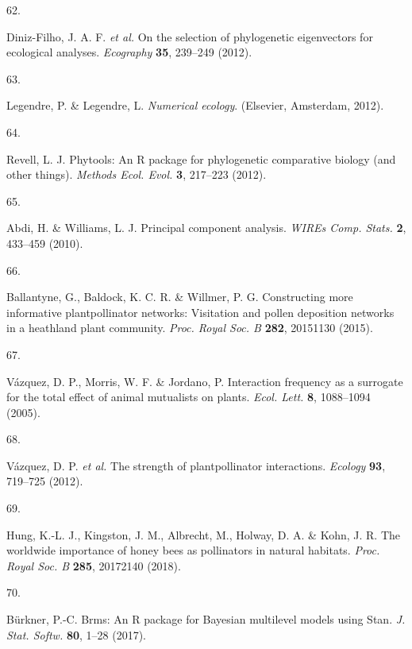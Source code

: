 \documentclass[
  12pt,
  a4paper,
]{article}
\newlength{\cslhangindent}
\newlength{\csllabelwidth}
\newlength{\cslentryspacingunit} %
\newenvironment{CSLReferences}[2] %
 {%
  \setlength{\parindent}{0pt}
  \ifodd #1
  \let\oldpar\par
  \def\par{\hangindent=\cslhangindent\oldpar}
  \fi
  \setlength{\parskip}{#2\cslentryspacingunit}
 }%
 {}
\newcommand{\CSLLeftMargin}[1]{\parbox[t]{\csllabelwidth}{#1}}
\newcommand{\CSLRightInline}[1]{\parbox[t]{\linewidth - \csllabelwidth}{#1}\break}
\begin{document}
\begin{CSLReferences}{0}{0}
\leavevmode{}%
\CSLLeftMargin{62. }
\CSLRightInline{Diniz-Filho, J. A. F. \emph{et al.} On the selection of phylogenetic eigenvectors for ecological analyses. \emph{Ecography} \textbf{35}, 239--249 (2012).}

\leavevmode{}%
\CSLLeftMargin{63. }
\CSLRightInline{Legendre, P. \& Legendre, L. \emph{Numerical ecology}. ({Elsevier, Amsterdam}, 2012).}

\leavevmode{}%
\CSLLeftMargin{64. }
\CSLRightInline{Revell, L. J. Phytools: An {R} package for phylogenetic comparative biology (and other things). \emph{Methods Ecol. Evol.} \textbf{3}, 217--223 (2012).}

\leavevmode{}%
\CSLLeftMargin{65. }
\CSLRightInline{Abdi, H. \& Williams, L. J. Principal component analysis. \emph{WIREs Comp. Stats.} \textbf{2}, 433--459 (2010).}

\leavevmode{}%
\CSLLeftMargin{66. }
\CSLRightInline{Ballantyne, G., Baldock, K. C. R. \& Willmer, P. G. Constructing more informative plant\textendash pollinator networks: Visitation and pollen deposition networks in a heathland plant community. \emph{Proc. Royal Soc. B} \textbf{282}, 20151130 (2015).}

\leavevmode{}%
\CSLLeftMargin{67. }
\CSLRightInline{Vázquez, D. P., Morris, W. F. \& Jordano, P. Interaction frequency as a surrogate for the total effect of animal mutualists on plants. \emph{Ecol. Lett.} \textbf{8}, 1088--1094 (2005).}

\leavevmode{}%
\CSLLeftMargin{68. }
\CSLRightInline{Vázquez, D. P. \emph{et al.} The strength of plant\textendash pollinator interactions. \emph{Ecology} \textbf{93}, 719--725 (2012).}

\leavevmode{}%
\CSLLeftMargin{69. }
\CSLRightInline{Hung, K.-L. J., Kingston, J. M., Albrecht, M., Holway, D. A. \& Kohn, J. R. The worldwide importance of honey bees as pollinators in natural habitats. \emph{Proc. Royal Soc. B} \textbf{285}, 20172140 (2018).}

\leavevmode{}%
\CSLLeftMargin{70. }
\CSLRightInline{Bürkner, P.-C. Brms: {An R} package for {Bayesian} multilevel models using {Stan}. \emph{J. Stat. Softw.} \textbf{80}, 1--28 (2017).}


\end{CSLReferences}
\end{document}
